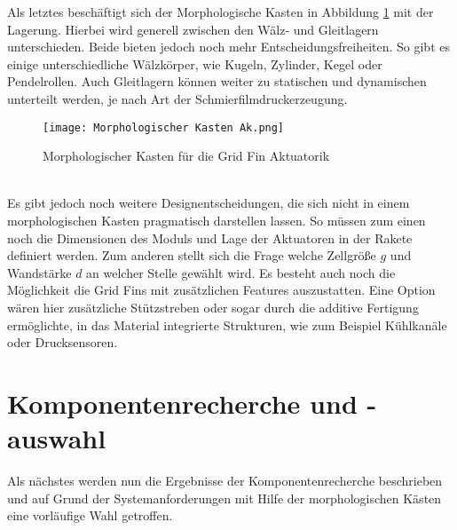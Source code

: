 Als letztes beschäftigt sich der Morphologische Kasten in Abbildung \ref{abb_MorphKastAk} mit der Lagerung. Hierbei wird generell zwischen den Wälz- und Gleitlagern unterschieden. Beide bieten jedoch noch mehr Entscheidungsfreiheiten. So gibt es einige unterschiedliche Wälzkörper, wie Kugeln, Zylinder, Kegel oder Pendelrollen. Auch Gleitlagern können weiter zu statischen und dynamischen unterteilt werden, je nach Art der Schmierfilmdruckerzeugung.
\begin{figure}[h]
	\centering
	\texttt{[image: Morphologischer Kasten Ak.png]}
	\caption{Morphologischer Kasten für die Grid Fin Aktuatorik}
	\label{abb_MorphKastAk}
\end{figure}\\
Es gibt jedoch noch weitere Designentscheidungen, die sich nicht in einem morphologischen Kasten pragmatisch darstellen lassen. So müssen zum einen noch die Dimensionen des Moduls und Lage der Aktuatoren in der Rakete definiert werden. Zum anderen stellt sich die Frage welche Zellgröße $g$ und Wandstärke $d$ an welcher Stelle gewählt wird. Es besteht auch noch die Möglichkeit die Grid Fins mit zusätzlichen Features auszustatten. Eine Option wären hier zusätzliche Stützstreben oder sogar durch die additive Fertigung ermöglichte, in das Material integrierte Strukturen, wie zum Beispiel Kühlkanäle oder Drucksensoren.
\newpage
\section{Komponentenrecherche und -auswahl}
Als nächstes werden nun die Ergebnisse der Komponentenrecherche beschrieben und auf Grund der Systemanforderungen mit Hilfe der morphologischen Kästen eine vorläufige Wahl getroffen.
